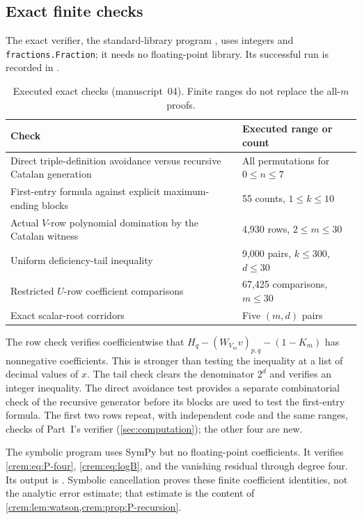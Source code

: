 \documentclass[11pt,a4paper]{article}
\theoremstyle{definition}\newaliascnt{definition}{theorem}
\theoremstyle{remark}\newaliascnt{remark}{theorem}
\begin{document}
\subsection{Exact finite checks}
The exact verifier, the standard-library program
, uses integers and
\texttt{fractions.Fraction}; it needs no floating-point library. Its successful run is recorded in
.
\begin{table}[htbp]
\centering\small
\caption{Executed exact checks (manuscript~04). Finite ranges do not replace
the all-$m$ proofs.}
\label{crem:tab:exact-checks}
\begin{tabular}{p{.61\linewidth}p{.29\linewidth}}
\toprule
Check & Executed range or count\\
\midrule
Direct triple-definition avoidance versus recursive Catalan generation
 & All permutations for $0\le n\le7$\\
First-entry formula against explicit maximum-ending blocks & 55 counts, $1\le k\le10$\\
Actual $V$-row polynomial domination by the Catalan witness & 4,930 rows, $2\le m\le30$\\
Uniform deficiency-tail inequality & 9,000 pairs, $k\le300$, $d\le30$\\
Restricted $U$-row coefficient comparisons & 67,425 comparisons, $m\le30$\\
Exact scalar-root corridors & Five $(m,d)$ pairs\\
\bottomrule
\end{tabular}
\end{table}
The row check verifies coefficientwise that $H_q-(W_{V_m}v)_{p,q}-(1-K_m)$
has nonnegative coefficients. This is stronger than testing the inequality
at a list of decimal values of $x$. The tail check clears the denominator
$2^d$ and verifies an integer inequality. The direct avoidance test provides
a separate combinatorial check of the recursive generator before its blocks
are used to test the first-entry formula. The first two rows repeat, with
independent code and the same ranges, checks of Part~I's verifier
(\cref{sec:computation}); the other four are new.

The symbolic program 
uses SymPy but no floating-point coefficients. It verifies
\eqref{crem:eq:P-four}, \eqref{crem:eq:logB}, and the vanishing residual
through degree four. Its output is
. Symbolic
cancellation proves these finite coefficient identities, not the analytic
error estimate; that estimate is the content of
\cref{crem:lem:watson,crem:prop:P-recursion}.
\end{document}
